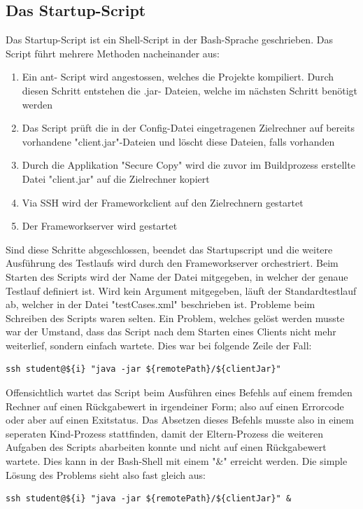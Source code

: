 \subsection{Das Startup-Script}
\label{sec:startupScript}
Das  Startup-Script ist ein Shell-Script in der Bash-Sprache geschrieben. Das Script führt mehrere Methoden nacheinander aus:
\begin{enumerate}
\item Ein ant- Script wird an\-ge\-stos\-sen, wel\-ches die Pro\-jek\-te kom\-pi\-liert. Durch die\-sen Schritt ent\-stehen die .jar- Dateien, welche im nächs\-ten Schritt benötigt werden
\item Das Script prüft die in der Config-Datei eingetragenen Zielrechner auf bereits vorhandene "client.jar"-Dateien und löscht diese Dateien, falls vorhanden
\item Durch die Applikation "Secure Copy" wird die zuvor im Buildprozess erstellte Datei "client.jar" auf die Zielrechner kopiert
\item Via SSH wird der Frameworkclient auf den Zielrechnern gestartet
\item Der Frameworkserver wird gestartet
\end{enumerate}
Sind diese Schritte abgeschlossen, beendet das Startupscript und die weitere Ausführung des Testlaufs wird durch den Frameworkserver orchestriert.
Beim Starten des Scripts wird der Name der Datei mitgegeben, in welcher der genaue Testlauf definiert ist. Wird kein Argument mitgegeben, läuft der Standardtestlauf ab, welcher in der Datei "testCases.xml" beschrieben ist.
Probleme beim Schreiben des Scripts waren selten. Ein Problem, welches gelöst werden musste war der Umstand, dass das Script nach dem Starten eines Clients nicht mehr weiterlief, sondern einfach wartete. Dies war bei folgende Zeile der Fall:
\begin{lstlisting}[breaklines=true]
 ssh student@${i} "java -jar ${remotePath}/${clientJar}"
\end{lstlisting}	
Offensichtlich wartet das Script beim Ausführen eines Befehls auf einem fremden Rechner auf einen Rückgabewert in irgendeiner Form; also auf einen Errorcode oder aber auf einen Exitstatus. Das Absetzen dieses Befehls musste also in einem seperaten Kind-Prozess stattfinden, damit der Eltern-Prozess die weiteren Aufgaben des Scripts abarbeiten konnte und nicht auf einen Rückgabewert wartete. Dies kann in der Bash-Shell mit einem "\&" erreicht werden. Die simple Lösung des Problems sieht also fast gleich aus:
\begin{lstlisting}[breaklines=true]
 ssh student@${i} "java -jar ${remotePath}/${clientJar}" &
\end{lstlisting}

